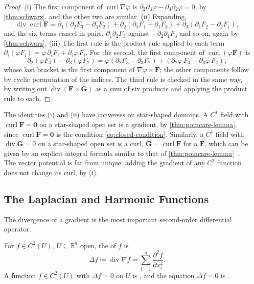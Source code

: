 \begin{proof}
(i) The first component of $\operatorname{curl}\nabla\varphi$ is $\partial_2\partial_3\varphi-\partial_3\partial_2\varphi=0$, by \cref{thm:schwarz}, and the other two are similar. (ii) Expanding,
\[
\operatorname{div}\operatorname{curl}\mathbf F=\partial_1(\partial_2F_3-\partial_3F_2)+\partial_2(\partial_3F_1-\partial_1F_3)+\partial_3(\partial_1F_2-\partial_2F_1),
\]
and the six terms cancel in pairs, $\partial_1\partial_2F_3$ against $-\partial_2\partial_1F_3$ and so on, again by \cref{thm:schwarz}. (iii) The first rule is the product rule applied to each term $\partial_i(\varphi F_i)=\varphi\,\partial_iF_i+\partial_i\varphi\,F_i$. For the second, the first component of $\operatorname{curl}(\varphi\mathbf F)$ is
\[
\partial_2(\varphi F_3)-\partial_3(\varphi F_2)=\varphi(\partial_2F_3-\partial_3F_2)+(\partial_2\varphi\,F_3-\partial_3\varphi\,F_2),
\]
whose last bracket is the first component of $\nabla\varphi\times\mathbf F$; the other components follow by cyclic permutation of the indices. The third rule is checked in the same way, by writing out $\operatorname{div}(\mathbf F\times\mathbf G)$ as a sum of six products and applying the product rule to each.
\end{proof}

The identities (i) and (ii) have converses on star-shaped domains. A $C^1$ field with $\operatorname{curl}\mathbf F=\mathbf0$ on a star-shaped open set is a gradient, by \cref{thm:poincare-lemma}, since $\operatorname{curl}\mathbf F=\mathbf0$ is the condition \eqref{eq:closed-condition}. Similarly, a $C^1$ field with $\operatorname{div}\mathbf G=0$ on a star-shaped open set is a curl, $\mathbf G=\operatorname{curl}\mathbf F$ for a  $\mathbf F$, which can be given by an explicit integral formula similar to that of \cref{thm:poincare-lemma}~\cite{apostol1969calculus}. The vector potential is far from unique: adding the gradient of any $C^2$ function does not change its curl, by (i).

\subsection{The Laplacian and Harmonic Functions}

The divergence of a gradient is the most important second-order differential operator.

\begin{definition}
\label{def:laplacian}
For $f\in C^2(U)$, $U\subseteq\mathbb R^n$ open, the  of $f$ is
\[
\Delta f\coloneqq\operatorname{div}\nabla f=\sum_{i=1}^n\frac{\partial^2f}{\partial x_i^2} .
\]
A function $f\in C^2(U)$ with $\Delta f=0$ on $U$ is , and the equation $\Delta f=0$ is .
\end{definition}


